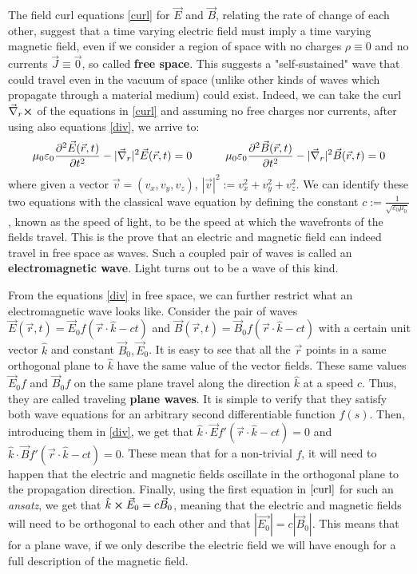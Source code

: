 \documentclass[11pt, a4paper, twoside]{article} %
\begin{document}
The field curl equations \eqref{curl} for $\vec{E}$ and $\vec{B}$, relating the rate of change of each other, suggest that a time varying electric field must imply a time varying magnetic field, even if we consider a region of space with no charges $\rho\equiv 0$ and no currents $\vec{J}\equiv\vec{0}$, so called {\bf free space}. This suggests a "self-sustained" wave that could travel even in the vacuum of space (unlike other kinds of waves which propagate through a material medium) could exist. Indeed, we can take the curl $\vec{\nabla}_r\cross$ of the equations in \eqref{curl} and assuming no free charges nor currents, after using also equations \eqref{div}, we arrive to:\vspace{-0.2cm}
\begin{equation}\label{waveeq}
\mu_0\varepsilon_0\pdv[2]{\vec{E}(\vec{r},t)}{t}-|\vec{\nabla}_r|^2\vec{E}(\vec{r},t)=0 \quad \quad \quad \mu_0\varepsilon_0\pdv[2]{\vec{B}(\vec{r},t)}{t}- |\vec{\nabla}_r|^2\vec{B}(\vec{r},t)=0 \vspace{-0.2cm}
\end{equation}
where given a vector $\vec{v}=(v_x,v_y,v_z)$, $|\vec{v}|^2:=v_x^2+v_y^2+v_z^2$. We can identify these two equations with the classical wave equation by defining the constant $c:=\frac{1}{\sqrt{\varepsilon_0\mu_0}}$, known as the speed of light, to be the speed at which the wavefronts of the fields travel. This is the prove that an electric and magnetic field can indeed travel in free space as waves. Such a coupled pair of waves is called an {\bf electromagnetic wave}. Light turns out to be a wave of this kind.

From the equations \eqref{div} in free space, we can further restrict what an electromagnetic wave looks like. Consider the pair of waves $\vec{E}(\vec{r},t)=\vec{E}_0f(\vec{r}\cdot \hat{k}-ct)$ and $\vec{B}(\vec{r},t)=\vec{B}_0f(\vec{r}\cdot \hat{k}-ct)$ with a certain unit vector $\hat{k}$ and constant $\vec{B}_0,\vec{E}_0$. It is easy to see that all the $\vec{r}$ points in a same orthogonal plane to $\hat{k}$ have the same value of the vector fields. These same values $\vec{E}_0f$ and $\vec{B}_0f$ on the same plane travel along the direction $\hat{k}$ at a speed $c$. Thus, they are called traveling {\bf plane waves}. It is simple to verify that they satisfy both wave equations for an arbitrary second differentiable function $f(s)$. Then, introducing them in \eqref{div}, we get that $\hat{k}\cdot\vec{E}f'(\vec{r}\cdot \hat{k}-ct)=0$ and $\hat{k}\cdot\vec{B}f'(\vec{r}\cdot \hat{k}-ct)=0$. These mean that for a non-trivial $f$, it will need to happen that the electric and magnetic fields oscillate in the orthogonal plane to the propagation direction. Finally, using the first equation in $\eqref{curl}$ for such an {\em ansatz}, we get that $\hat{k}\cross \vec{E}_0 =c \vec{B}_0$, meaning that the electric and magnetic fields will need to be orthogonal to each other and that $|\vec{E_0}|=c|\vec{B}_0|$. This means that for a plane wave, if we only describe the electric field we will have enough for a full description of the magnetic field. 
\end{document}
